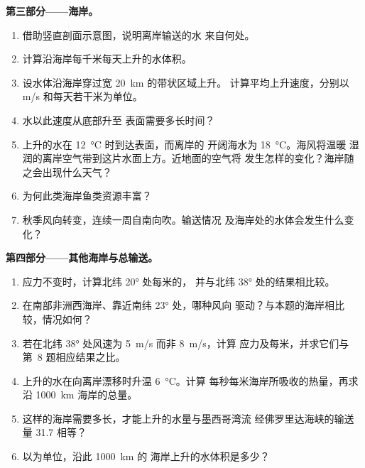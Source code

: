 \begin{problem}
\medskip
\noindent\textbf{第三部分——海岸。}
\begin{enumerate}[resume]
  \item 借助竖直剖面示意图，说明离岸输送的水
        来自何处。
  \item 计算沿海岸每千米每天上升的水体积。
  \item 设水体沿海岸穿过宽 \qty{20}{km} 的带状区域上升。
        计算平均上升速度，分别以 \unit{m/s} 和每天若干米为单位。
  \item 水以此速度从底部升至
        表面需要多长时间？
  \item 上升的水在 \qty{12}{\celsius} 时到达表面，而离岸的
        开阔海水为 \qty{18}{\celsius}。海风将温暖
        湿润的离岸空气带到这片水面上方。近地面的空气将
        发生怎样的变化？海岸随之会出现什么天气？
  \item 为何此类海岸鱼类资源丰富？
  \item 秋季风向转变，连续一周自南向吹。输送情况
        及海岸处的水体会发生什么变化？
\end{enumerate}

\medskip
\noindent\textbf{第四部分——其他海岸与总输送。}
\begin{enumerate}[resume]
  \item 应力不变时，计算北纬 \ang{20} 处每米的，
        并与北纬 \ang{38} 处的结果相比较。
  \item 在南部非洲西海岸、靠近南纬 \ang{23} 处，哪种风向
        驱动？与本题的海岸相比较，情况如何？
  \item 若在北纬 \ang{38} 处风速为 \qty{5}{m/s} 而非 \qty{8}{m/s}，计算
        应力及每米，并求它们与
        第~8 题相应结果之比。
  \item 上升的水在向离岸漂移时升温 \qty{6}{\celsius}。计算
        每秒每米海岸所吸收的热量，再求沿
        \qty{1000}{km} 海岸的总量。
  \item 这样的海岸需要多长，才能上升的水量与墨西哥湾流
        经佛罗里达海峡的输送量 \qty{31.7}{\sverdrup} 相等？
  \item 以为单位，沿此 \qty{1000}{km} 的
        海岸上升的水体积是多少？
\end{enumerate}
\end{problem}
